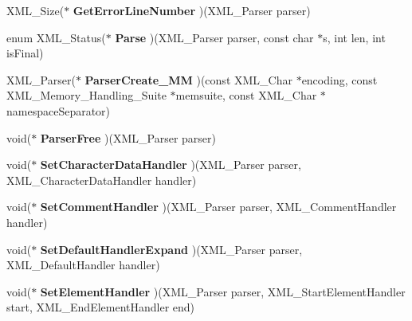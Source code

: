 \begin{DoxyCompactItemize}
\item 
X\+M\+L\+\_\+\+Size($\ast$ {\bfseries Get\+Error\+Line\+Number} )(X\+M\+L\+\_\+\+Parser parser)\hypertarget{structPyExpat__CAPI_a238c98224fe4c4761527fdb823e565cd}{}\label{structPyExpat__CAPI_a238c98224fe4c4761527fdb823e565cd}

\item 
enum X\+M\+L\+\_\+\+Status($\ast$ {\bfseries Parse} )(X\+M\+L\+\_\+\+Parser parser, const char $\ast$s, int len, int is\+Final)\hypertarget{structPyExpat__CAPI_a7d1e36f41cf7327ea479886dadb31321}{}\label{structPyExpat__CAPI_a7d1e36f41cf7327ea479886dadb31321}

\item 
X\+M\+L\+\_\+\+Parser($\ast$ {\bfseries Parser\+Create\+\_\+\+MM} )(const X\+M\+L\+\_\+\+Char $\ast$encoding, const X\+M\+L\+\_\+\+Memory\+\_\+\+Handling\+\_\+\+Suite $\ast$memsuite, const X\+M\+L\+\_\+\+Char $\ast$namespace\+Separator)\hypertarget{structPyExpat__CAPI_abb499eb0db9d22b485ed45be20100bd9}{}\label{structPyExpat__CAPI_abb499eb0db9d22b485ed45be20100bd9}

\item 
void($\ast$ {\bfseries Parser\+Free} )(X\+M\+L\+\_\+\+Parser parser)\hypertarget{structPyExpat__CAPI_a6f02d5578475c187cc6e187a15308eba}{}\label{structPyExpat__CAPI_a6f02d5578475c187cc6e187a15308eba}

\item 
void($\ast$ {\bfseries Set\+Character\+Data\+Handler} )(X\+M\+L\+\_\+\+Parser parser, X\+M\+L\+\_\+\+Character\+Data\+Handler handler)\hypertarget{structPyExpat__CAPI_a7440612167b3fa8089d41411a0904409}{}\label{structPyExpat__CAPI_a7440612167b3fa8089d41411a0904409}

\item 
void($\ast$ {\bfseries Set\+Comment\+Handler} )(X\+M\+L\+\_\+\+Parser parser, X\+M\+L\+\_\+\+Comment\+Handler handler)\hypertarget{structPyExpat__CAPI_a9199d4d4f57dda08f2e798351cdbb7ab}{}\label{structPyExpat__CAPI_a9199d4d4f57dda08f2e798351cdbb7ab}

\item 
void($\ast$ {\bfseries Set\+Default\+Handler\+Expand} )(X\+M\+L\+\_\+\+Parser parser, X\+M\+L\+\_\+\+Default\+Handler handler)\hypertarget{structPyExpat__CAPI_a0bee5d83ab5e9eb578ffb92cd60f8043}{}\label{structPyExpat__CAPI_a0bee5d83ab5e9eb578ffb92cd60f8043}

\item 
void($\ast$ {\bfseries Set\+Element\+Handler} )(X\+M\+L\+\_\+\+Parser parser, X\+M\+L\+\_\+\+Start\+Element\+Handler start, X\+M\+L\+\_\+\+End\+Element\+Handler end)\hypertarget{structPyExpat__CAPI_a53fc65a60b9dae1d652221e2dfdeb4d0}{}\label{structPyExpat__CAPI_a53fc65a60b9dae1d652221e2dfdeb4d0}


\end{DoxyCompactItemize}
